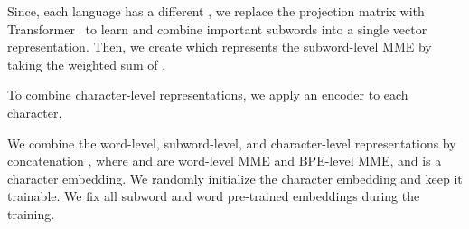 \documentclass[11pt,a4paper]{article}
\begin{document}
Since, each language has a different , we replace the projection matrix with Transformer~\cite{vaswani2017attention} to learn and combine important subwords into a single vector representation. Then, we create  which represents the subword-level MME by taking the weighted sum of .


\begin{table}[!t]
\centering
{}
\caption{Comparison to existing works. \textbf{Ensemble:} We run a majority voting scheme from five different models.}
\label{tab:existing}
\end{table}

To combine character-level representations, we apply an encoder to each character.


We combine the word-level, subword-level, and character-level representations by concatenation , where  and  are word-level MME and BPE-level MME, and  is a character embedding. We randomly initialize the character embedding and keep it trainable. We fix all subword and word pre-trained embeddings during the training.
\end{document}
